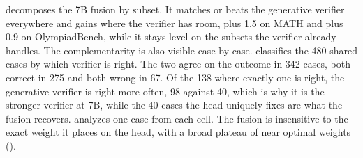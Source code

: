  decomposes the 7B fusion by subset. It matches or beats the generative verifier everywhere and gains where the verifier has room, plus 1.5 on MATH and plus 0.9 on OlympiadBench, while it stays level on the subsets the verifier already handles. The complementarity is also visible case by case.  classifies the 480 shared cases by which verifier is right. The two agree on the outcome in 342 cases, both correct in 275 and both wrong in 67. Of the 138 where exactly one is right, the generative verifier is right more often, 98 against 40, which is why it is the stronger verifier at 7B, while the 40 cases the head uniquely fixes are what the fusion recovers.  analyzes one case from each cell. The fusion is insensitive to the exact weight it places on the head, with a broad plateau of near optimal weights ().

